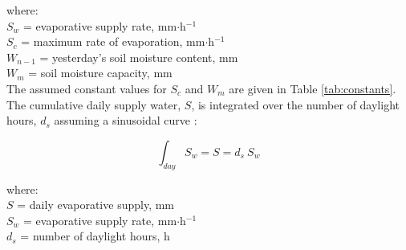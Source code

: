 \noindent where: \\
\indent $S_w$ = evaporative supply rate, mm$\cdot$h$^{-1}$\\
\indent $S_c$ = maximum rate of evaporation, mm$\cdot$h$^{-1}$\\
\indent $W_{n-1}$ = yesterday's soil moisture content, mm\\
\indent $W_m$ = soil moisture capacity, mm\\

\noindent The assumed constant values for $S_c$ and $W_m$ are given in Table \ref{tab:constants}. 
The cumulative daily supply water, $S$, is integrated over the number of daylight hours, $d_s$ assuming a sinusoidal curve \parencite[Eq. 18b]{federer82}:

\begin{equation}
\label{eq:sd}
    \int_{day} S_{w} = S = d_s\: S_w
\end{equation}

\noindent where: \\
\indent $S$ = daily evaporative supply, mm\\
\indent $S_{w}$ = evaporative supply rate, mm$\cdot$h$^{-1}$\\
\indent $d_s$ = number of daylight hours, h\\

